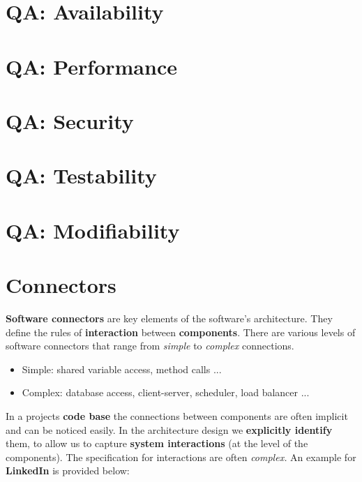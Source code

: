 \documentclass[a4paper]{article}
\begin{document}
\section{QA: Availability}

\section{QA: Performance}

\section{QA: Security}

\section{QA: Testability}

\section{QA: Modifiability}

\newpage
\section{Connectors}

\textbf{Software connectors} are key elements of the software's architecture. They define the rules of \textbf{interaction} between \textbf{components}. There are various levels of software connectors that range from \textit{simple} to \textit{complex} connections.
\begin{itemize}
\item Simple: shared variable access, method calls ...
\item Complex: database access, client-server, scheduler, load balancer ...\\
\end{itemize}

In a projects \textbf{code base} the connections between components are often implicit and can be noticed easily. In the architecture design we \textbf{explicitly identify} them, to allow us to capture \textbf{system interactions} (at the level of the components). The specification for interactions are often \textit{complex.} An example for \textbf{LinkedIn} is provided below:\\
\end{document}
